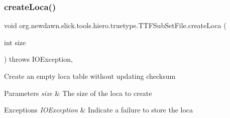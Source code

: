 \subsubsection{\texorpdfstring{create\+Loca()}{createLoca()}}
{\footnotesize\ttfamily void org.\+newdawn.\+slick.\+tools.\+hiero.\+truetype.\+T\+T\+F\+Sub\+Set\+File.\+create\+Loca (\begin{DoxyParamCaption}\item[{int}]{size }\end{DoxyParamCaption}) throws I\+O\+Exception\hspace{0.3cm}{\ttfamily [inline]}, {\ttfamily [private]}}

Create an empty loca table without updating checksum


\begin{DoxyParams}{Parameters}
{\em size} & The size of the loca to create \\
\hline
\end{DoxyParams}

\begin{DoxyExceptions}{Exceptions}
{\em I\+O\+Exception} & Indicate a failure to store the loca \\
\hline
\end{DoxyExceptions}

